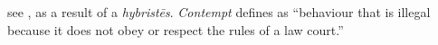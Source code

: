 \item[Contempt,]

see , as a result of a \emph{hybristēs}. \emph{Contempt} defines as ``behaviour that is illegal because it does not obey or respect the rules of a law court.''

